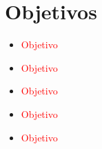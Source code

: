 \section*{Objetivos}
	\begin{itemize}
		\item \textcolor{red}{Objetivo}
		\item \textcolor{red}{Objetivo}
		\item \textcolor{red}{Objetivo}
		\item \textcolor{red}{Objetivo}
		\item \textcolor{red}{Objetivo}
	\end{itemize}
\newpage